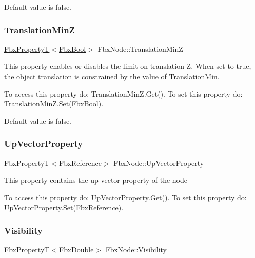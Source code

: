 Default value is false. \mbox{\label{class_fbx_node_a0e89c2861ae7bb58014dd0f4ffe069be}} 
\subsubsection{\texorpdfstring{Translation\+MinZ}{TranslationMinZ}}
{\footnotesize\ttfamily \hyperlink{class_fbx_property_t}{Fbx\+PropertyT}$<$\hyperlink{fbxtypes_8h_a92e0562b2fe33e76a242f498b362262e}{Fbx\+Bool}$>$ Fbx\+Node\+::\+Translation\+MinZ}

This property enables or disables the limit on translation Z. When set to {\ttfamily true}, the object translation is constrained by the value of \hyperlink{class_fbx_node_aaaa913d4332c2136f50ae15356521413}{Translation\+Min}.

To access this property do\+: Translation\+Min\+Z.\+Get(). To set this property do\+: Translation\+Min\+Z.\+Set(\+Fbx\+Bool).

Default value is false. \mbox{\label{class_fbx_node_a657f66c69f9ac6811487c95f01d0c345}} 
\subsubsection{\texorpdfstring{Up\+Vector\+Property}{UpVectorProperty}}
{\footnotesize\ttfamily \hyperlink{class_fbx_property_t}{Fbx\+PropertyT}$<$\hyperlink{fbxtypes_8h_a44df6a2eec915cf27cd481e5c5e48a24}{Fbx\+Reference}$>$ Fbx\+Node\+::\+Up\+Vector\+Property}

This property contains the up vector property of the node

To access this property do\+: Up\+Vector\+Property.\+Get(). To set this property do\+: Up\+Vector\+Property.\+Set(\+Fbx\+Reference). \mbox{\label{class_fbx_node_a9f02f0a70b81c1a656137def3e34edb7}} 
\subsubsection{\texorpdfstring{Visibility}{Visibility}}
{\footnotesize\ttfamily \hyperlink{class_fbx_property_t}{Fbx\+PropertyT}$<$\hyperlink{fbxtypes_8h_a171e72a1c46fc15c1a6c9c31948c1c5b}{Fbx\+Double}$>$ Fbx\+Node\+::\+Visibility}

